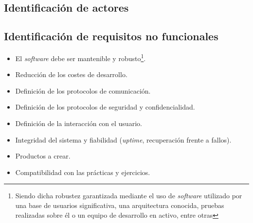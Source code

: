 \documentclass{article}
\begin{document}
\subsection{Identificación de actores}

\subsection{Identificación de requisitos no funcionales}

\begin{itemize}
  \item El \textit{software} debe ser mantenible y robusto\footnote{Siendo dicha robustez garantizada mediante el uso de \textit{software} utilizado por una base de usuarios significativa, una arquitectura conocida, pruebas realizadas sobre él o un equipo de desarrollo en activo, entre otras}.
  \item Reducción de los costes de desarrollo.
  \item Definición de los protocolos de comunicación.
  \item Definición de los protocolos de seguridad y confidencialidad.
  \item Definición de la interacción con el usuario.
  \item Integridad del sistema y fiabilidad (\textit{uptime}, recuperación frente a fallos).
  \item Productos a crear.
  \item Compatibilidad con las prácticas y ejercicios.
\end{itemize}




\end{document}
